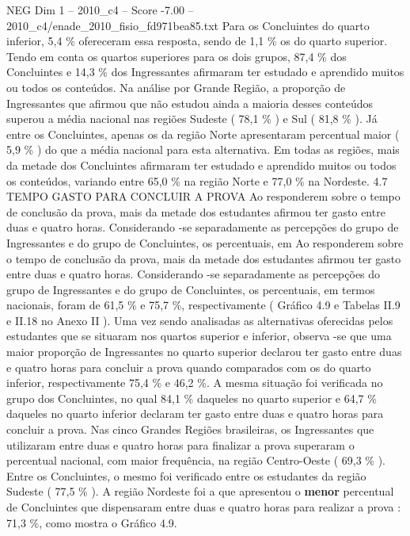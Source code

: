 \begin{textsample}{NEG Dim 1 – 2010\_c4 – Score -7.00 – 2010\_c4/enade\_2010\_fisio\_fd971bea85.txt}
Para os Concluintes do quarto inferior, 5,4 \% ofereceram essa resposta, sendo de 1,1 \% os do quarto superior.
Tendo em conta os quartos superiores para os dois grupos, 87,4 \% dos Concluintes e 14,3 \% dos Ingressantes afirmaram ter estudado e aprendido muitos ou todos os conteúdos.
Na análise por Grande Região, a proporção de Ingressantes que afirmou que não estudou ainda a maioria desses conteúdos superou a média nacional nas regiões Sudeste ( 78,1 \% ) e Sul ( 81,8 \% ).
Já entre os Concluintes, apenas os da região Norte apresentaram percentual maior ( 5,9 \% ) do que a média nacional para esta alternativa.
Em todas as regiões, mais da metade dos Concluintes afirmaram ter estudado e aprendido muitos ou todos os conteúdos, variando entre 65,0 \% na região Norte e 77,0 \% na Nordeste. 4.7 TEMPO GASTO PARA CONCLUIR A PROVA Ao responderem sobre o tempo de conclusão da prova, mais da metade dos estudantes afirmou ter gasto entre duas e quatro horas.
Considerando -se separadamente as percepções do grupo de Ingressantes e do grupo de Concluintes, os percentuais, em Ao responderem sobre o tempo de conclusão da prova, mais da metade dos estudantes afirmou ter gasto entre duas e quatro horas.
Considerando -se separadamente as percepções do grupo de Ingressantes e do grupo de Concluintes, os percentuais, em termos nacionais, foram de 61,5 \% e 75,7 \%, respectivamente ( Gráfico 4.9 e Tabelas II.9 e II.18 no Anexo II ).
Uma vez sendo analisadas as alternativas oferecidas pelos estudantes que se situaram nos quartos superior e inferior, observa -se que uma maior proporção de Ingressantes no quarto superior declarou ter gasto entre duas e quatro horas para concluir a prova quando comparados com os do quarto inferior, respectivamente 75,4 \% e 46,2 \%.
A mesma situação foi verificada no grupo dos Concluintes, no qual 84,1 \% daqueles no quarto superior e 64,7 \% daqueles no quarto inferior declaram ter gasto entre duas e quatro horas para concluir a prova.
Nas cinco Grandes Regiões brasileiras, os Ingressantes que utilizaram entre duas e quatro horas para finalizar a prova superaram o percentual nacional, com maior frequência, na região Centro-Oeste ( 69,3 \% ).
Entre os Concluintes, o mesmo foi verificado entre os estudantes da região Sudeste ( 77,5 \% ).
A região Nordeste foi a que apresentou o \textbf{menor} percentual de Concluintes que dispensaram entre duas e quatro horas para realizar a prova : 71,3 \%, como mostra o Gráfico 4.9.

\end{textsample}
